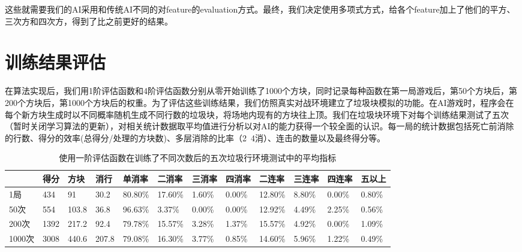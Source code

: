 \documentclass[10pt,UTF8]{article}
\begin{document}
\begin{multicols}{2}
这些就需要我们的AI采用和传统AI不同的对feature的evaluation方式。最终，我们决定使用多项式方式，给各个feature加上了他们的平方、三次方和四次方，得到了比之前更好的结果。

\section{训练结果评估}

在算法实现后，我们用1阶评估函数和4阶评估函数分别从零开始训练了1000个方块，同时记录每种函数在第一局游戏后，第50个方块后，第200个方块后，第1000个方块后的权重。为了评估这些训练结果，我们仿照真实对战环境建立了垃圾块模拟的功能。在AI游戏时，程序会在每个新方块生成时以不同概率随机生成不同行数的垃圾块，将场地内现有的方块往上顶。我们在垃圾块环境下对每个训练结果测试了五次（暂时关闭学习算法的更新），对相关统计数据取平均值进行分析以对AI的能力获得一个较全面的认识。每一局的统计数据包括死亡前消除的行数、得分的效率(总得分/处理的方块数)、多层消除的比率（2~4消）、连击的数量以及最终得分等。
\end{multicols}
\begin{table}[h]
    \centering
    \caption{使用一阶评估函数在训练了不同次数后的五次垃圾行环境测试中的平均指标}
    \begin{tabular}{@{}llllllllllll@{}}
    \toprule
          & 得分   & 方块    & 消行    & 单消率     & 二消率     & 三消率    & 四消率    & 二连率     & 三连率    & 四连率    & 五以上    \\ \midrule
    1局    & 434  & 91    & 30.2  & 80.80\% & 17.60\% & 1.60\% & 0.00\% & 12.80\% & 8.80\% & 0.00\% & 0.80\% \\
    50次   & 554  & 103.8 & 36.8  & 96.63\% & 3.37\%  & 0.00\% & 0.00\% & 12.92\% & 4.49\% & 2.25\% & 0.56\% \\
    200次  & 1392 & 217.2 & 92.4  & 79.78\% & 15.57\% & 3.28\% & 1.37\% & 15.57\% & 4.92\% & 0.00\% & 1.09\% \\
    1000次 & 3008 & 440.6 & 207.8 & 79.08\% & 16.30\% & 3.77\% & 0.85\% & 14.60\% & 5.96\% & 1.22\% & 0.49\% \\ \bottomrule
    \end{tabular}
\end{table}
\end{document}
